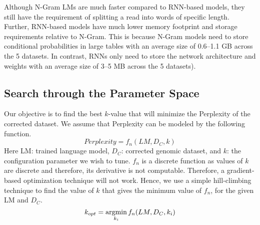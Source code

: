  Although N-Gram LMs are much faster compared to RNN-based models, they still have the requirement of splitting a read into words of specific length.
Further, RNN-based models have much lower memory footprint and storage requirements relative to N-Gram. This is because N-Gram models need to store conditional probabilities in large tables with an average size of 0.6--1.1 GB across the 5 datasets. In contrast, RNNs only need to store the network architecture and  weights with an average size of 3--5 MB across the 5 datasets). 

\subsection{Search through the Parameter Space}
Our objective is to find the best $k$-value that will minimize the Perplexity of the corrected dataset. We assume that Perplexity can be modeled by the following function.
\begin{equation}
Perplexity = f_{n}(LM, D_C, k)
\end{equation} 
Here LM: trained language model, $D_C$: corrected genomic dataset, and $k$: the configuration parameter we wish to tune.
$f_{n}$ is a discrete function as values of $k$ are discrete and therefore, its derivative is not computable. Therefore, a gradient-based optimization technique will not work. Hence, we use a simple hill-climbing technique to find the value of $k$ that gives the minimum value of $f_n$, for the given LM and $D_C$.
\begin{equation}
  k_{opt} = \operatorname*{argmin}_{k_i} f_{n}(LM, D_C, k_i)
\end{equation} 


